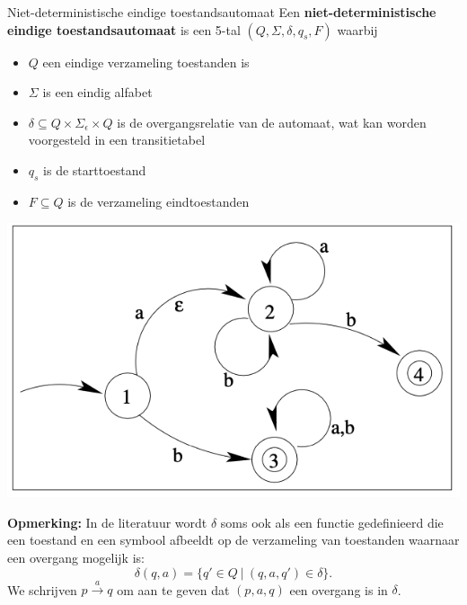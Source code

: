 \begin{theo}{Niet-deterministische eindige toestandsautomaat}
    Een \textbf{niet-deterministische eindige toestandsautomaat} is een 5-tal $(Q,\Sigma, \delta, q_s, F)$ waarbij

    \vspace{0.5cm}

    \begin{minipage}{.61\textwidth}
        \begin{itemize}
            \item $Q$ een eindige verzameling toestanden is
            \item $\Sigma$ is een eindig alfabet
            \item $\delta \subseteq Q \times \Sigma_{\epsilon} \times Q$ is de overgangsrelatie van de automaat, wat kan worden voorgesteld in een transitietabel
            \item $q_s$ is de starttoestand
            \item $F \subseteq Q$ is de verzameling eindtoestanden
        \end{itemize}
    \end{minipage}
    \hspace{0.3cm}
    \begin{minipage}{.35\textwidth}
        \begin{center}
            \includegraphics[scale = 0.25]{Images/NFA}
        \end{center}
    \end{minipage}

    \vspace{0.5cm}

    \textbf{Opmerking:} In de literatuur wordt $\delta$ soms ook als een functie gedefinieerd die een toestand en een symbool afbeeldt op de verzameling van toestanden waarnaar een overgang mogelijk is:
    \begin{equation*}
        \delta(q,a) = \{ q' \in Q \ | \ (q,a,q') \in \delta \}.
    \end{equation*}
    We schrijven $p \overset{a}{\to} q$ om aan te geven dat $(p,a,q)$ een overgang is in $\delta$.
\end{theo}
    
